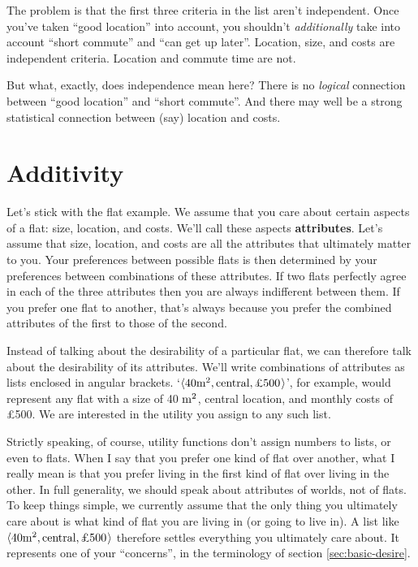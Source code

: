The problem is that the first three criteria in the list aren't independent.
Once you've taken ``good location'' into account, you shouldn't
\emph{additionally} take into account ``short commute'' and ``can get up
later''. Location, size, and costs are independent criteria. Location and
commute time are not.

But what, exactly, does independence mean here? There is no \emph{logical}
connection between ``good location'' and ``short commute''. And there may well
be a strong statistical connection between (say) location and costs.

\section{Additivity}\label{sec:additivity}

Let's stick with the flat example. We assume that you care about certain aspects
of a flat: size, location, and costs. We'll call these aspects
\textbf{attributes}. Let's assume that size, location, and costs are all the
attributes that ultimately matter to you. Your preferences between possible
flats is then determined by your preferences between combinations of these
attributes. If two flats perfectly agree in each of the three attributes then
you are always indifferent between them. If you prefer one flat to another,
that's always because you prefer the combined attributes of the first to those
of the second.

Instead of talking about the desirability of a particular flat, we can therefore
talk about the desirability of its attributes. We'll write combinations of
attributes as lists enclosed in angular brackets.
`$\t{40 \m^2, \text{central}, \text{£500}}$', for example, would represent any
flat with a size of 40 $\text{m}^2$, central location, and monthly costs of £500. We
are interested in the utility you assign to any such list.



Strictly speaking, of course, utility functions don't assign numbers to lists,
or even to flats. When I say that you prefer one kind of flat over another, what
I really mean is that you prefer living in the first kind of flat over living in
the other. In full generality, we should speak about attributes of worlds, not
of flats. To keep things simple, we currently assume that the only thing you
ultimately care about is what kind of flat you are living in (or going to live
in). A list like $\t{40 \m^2, \text{central}, \text{£500}}$ therefore settles
everything you ultimately care about. It represents one of your ``concerns'', in
the terminology of section \ref{sec:basic-desire}.

